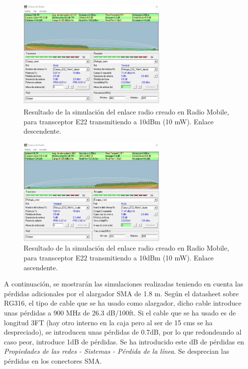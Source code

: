 \documentclass[12pt]{article}
\begin{document}
	\pagebreak
	
	\begin{figure}[h!]
		\begin{center}
			\includegraphics[width=0.65\textwidth]{img/resultado_e22_10mW_desc.png}
			\caption{Resultado de la simulación del enlace radio creado en Radio Mobile, para transceptor E22 transmitiendo a 10dBm (10 mW). Enlace descendente.}
			\label{fig: resultado enlace e22 10mW descendente radio mobile}
		\end{center}
	\end{figure}
	
	
	\begin{figure}[h!]
		\begin{center}
			\includegraphics[width=0.65\textwidth]{img/resultado_e22_10mW_asc.png}
			\caption{Resultado de la simulación del enlace radio creado en Radio Mobile, para transceptor E22 transmitiendo a 10dBm (10 mW). Enlace ascendente.}
			\label{fig: resultado enlace e22 10mW ascendente radio mobile}
		\end{center}
	\end{figure}
	
	\pagebreak
	
	\noindent A continuación, se mostrarán las simulaciones realizadas teniendo en cuenta las pérdidas adicionales por el alargador SMA de 1.8 m. Según el datasheet sobre RG316, el tipo de cable que se ha usado como alargador, dicho cable introduce unas pérdidas a 900 MHz de 26.3 dB/100ft. Si el cable que se ha usado es de longitud 3FT (hay otro interno en la caja pero al ser de 15 cms se ha despreciado), se introducen unas pérdidas de 0.7dB, por lo que redondeando al caso peor, introduce 1dB de pérdidas. Se ha introducido este dB de pérdidas en \textit{Propiedades de las redes - Sistemas - Pérdida de la línea}. Se desprecian las pérdidas en los conectores SMA.\\
	
\end{document}
